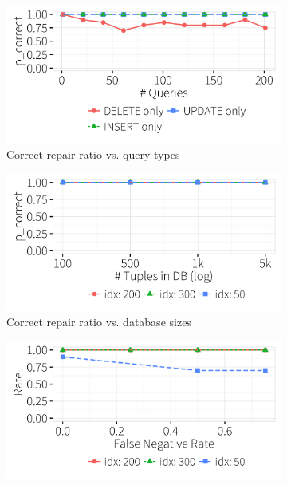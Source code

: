    \begin{figure}[ht]
  \centering
  \begin{subfigure} [t]{.3\textwidth}
    \includegraphics[width = .99\columnwidth]{figures/indelup_acc_idx}
    \vspace*{-.25in}
    \caption{Correct repair ratio vs. query types}
    \label{f:querytyperatio} 
    \end{subfigure}
    \begin{subfigure} [t]{.3\textwidth}
    \includegraphics[width = .99\columnwidth]{figures/dbsize_acc_idx}
    \vspace*{-.25in}
    \caption{Correct repair ratio vs. database sizes}
    \label{f:dbsizeratio} 
    \end{subfigure}
    \begin{subfigure} [t]{.3\textwidth}
    \includegraphics[width = .99\columnwidth]{figures/noise_fn_acc_idx}

\end{subfigure}
\end{figure}
